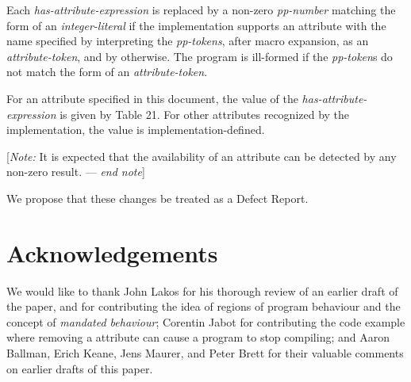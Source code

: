 \begin{adjustwidth}{0.5cm}{0.5cm}
Each \emph{has-attribute-expression} is replaced by a non-zero \emph{pp-number} matching the form of an \emph{integer-literal} if the implementation supports an attribute with the name specified by interpreting the \emph{pp-tokens}, after macro expansion, as an \emph{attribute-token}, and by  otherwise. The program is ill-formed if the \emph{pp-token}s do not match the form of an \emph{attribute-token}.

For an attribute specified in this document, the value of the \emph{has-attribute-expression} is given by Table 21. For other attributes recognized by the implementation, the value is implementation-defined.

[\emph{Note:} It is expected that the availability of an attribute can be detected by any non-zero result. --- \emph{end note}] 
\end{adjustwidth}

We propose that these changes be treated as a Defect Report.

\section*{Acknowledgements}
We would like to thank John Lakos for his thorough review of an earlier draft of the paper, and for contributing the idea of regions of program behaviour and the concept of \emph{mandated behaviour}; Corentin Jabot for contributing the code example where removing a \mbox{} attribute can cause a program to stop compiling; and Aaron Ballman, Erich Keane, Jens Maurer, and Peter Brett for their valuable comments on earlier drafts of this paper.

\renewcommand{\bibname}{References}



